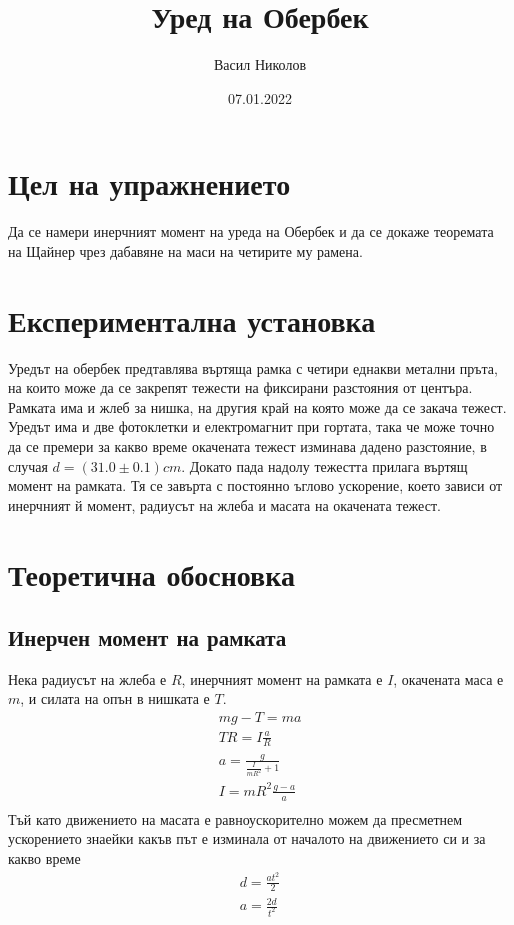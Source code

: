 \documentclass[aps, prb, twocolumn, a4paper, floatfix, reprint]{revtex4-2}
\begin{document}
\title{Уред на Обербек}
\author{Васил Николов}
\noaffiliation
\date{07.01.2022}
\maketitle

\section{Цел на упражнението}
Да се намери инерчният момент на уреда на Обербек и да се докаже теоремата на Щайнер чрез дабавяне на маси на четирите му рамена. 

\section{Експериментална установка}
Уредът на обербек предтавлява въртяща рамка с четири еднакви метални пръта, на които може да се закрепят тежести на фиксирани разстояния от центъра. Рамката има и жлеб за нишка, на другия край на която може да се закача тежест. Уредът има и две фотоклетки и електромагнит при гортата, така че може точно да се премери за какво време окачената тежест изминава дадено разстояние, в случая $d=(31.0 \pm 0.1) cm$. Докато пада надолу тежестта прилага въртящ момент на рамката. Тя се завърта с постоянно ъглово ускорение, което зависи от инерчният й момент, радиусът на жлеба и масата на окачената тежест. 

\section{Теоретична обосновка}
\subsection{Инерчен момент на рамката}
Нека радиусът на жлеба е $R$, инерчният момент на рамката е $I$, окачената маса е $m$, и силата на опън в нишката е $T$. 
\begin{gather*}
    mg - T = ma \\
    TR = I\frac{a}{R} \\
    a = \frac{g}{\frac{I}{mR^2} + 1} \tag{1} \label{eq:1}\\
    I = mR^2 \frac{g - a}{a} \tag{2} \label{eq:2} \\
\end{gather*}
Тъй като движението на масата е равноускорително можем да пресметнем ускорението знаейки какъв път е изминала от началото на движението си и за какво време
\begin{gather*}
    d = \frac{at^2}{2} \\
    a = \frac{2d}{t^2} \\
\end{gather*}
\end{document}
